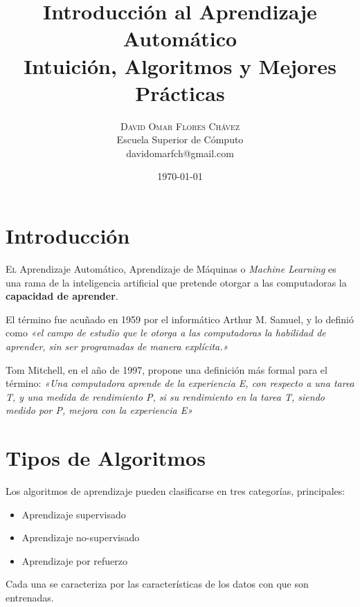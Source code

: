 \documentclass[twoside,twocolumn]{article}
\title{Introducción al Aprendizaje Automático
    \large \\[2\baselineskip]
    Intuición, Algoritmos y Mejores Prácticas
    \\[2\baselineskip]
  } %
\author{
      \textsc{David Omar Flores Chávez} \\[1ex] %
      \normalsize Escuela Superior de Cómputo \\ %
      \normalsize {davidomarfch@gmail.com}\\[2\baselineskip] %
  }
\date{\today} %
\begin{document}
  
  \maketitle
  
  \section{Introducción}
  
    \lettrine[nindent=0em,lines=3]{E} 
    l Aprendizaje Automático, 
    Aprendizaje de Máquinas o \textit{Machine Learning} es una rama
    de la inteligencia artificial que pretende otorgar a las computadoras
    la \textbf{capacidad de aprender}.

    El término fue acuñado en 1959 por el informático Arthur M. Samuel, y lo
    definió como \textit{«el campo de estudio que le otorga a las computadoras
    la habilidad de aprender, sin ser programadas de manera explícita.»} \cite{Samuel:1959:SML:1661923.1661924}

    Tom Mitchell, en el año de 1997, propone una definición más formal para el
    término: \textit{«Una computadora aprende de la experiencia E, con respecto a
    una tarea T, y una medida de rendimiento P, si su rendimiento en la tarea T,
    siendo medido por P, mejora con la experiencia E»} \cite{Mitchell1997}

  
  \section{Tipos de Algoritmos}
  
      Los algoritmos de aprendizaje pueden clasificarse en tres
      categorías, principales:

      \begin{itemize}
        \item Aprendizaje supervisado
        \item Aprendizaje no-supervisado
        \item Aprendizaje por refuerzo
      \end{itemize}
      
      Cada una se caracteriza por las características de los datos
      con que son entrenadas.
\end{document}
